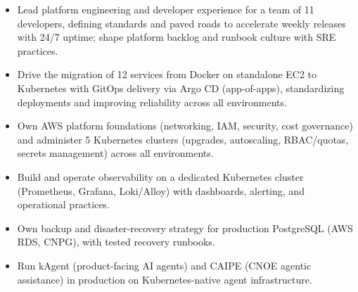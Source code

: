 \documentclass[10pt,a4paper]{altacv}
\begin{document}
\begin{itemize}
  \item Lead platform engineering and developer experience for a team of 11 developers, defining standards and paved roads to accelerate weekly releases with 24/7 uptime; shape platform backlog and runbook culture with SRE practices.
  \item Drive the migration of 12 services from Docker on standalone EC2 to Kubernetes with GitOps delivery via Argo CD (app-of-apps), standardizing deployments and improving reliability across all environments.
  \item Own AWS platform foundations (networking, IAM, security, cost governance) and administer 5 Kubernetes clusters (upgrades, autoscaling, RBAC/quotas, secrets management) across all environments.
  \item Build and operate observability on a dedicated Kubernetes cluster (Prometheus, Grafana, Loki/Alloy) with dashboards, alerting, and operational practices.
  \item Own backup and disaster-recovery strategy for production PostgreSQL (AWS RDS, CNPG), with tested recovery runbooks.
  \item Run kAgent (product-facing AI agents) and CAIPE (CNOE agentic assistance) in production on Kubernetes-native agent infrastructure.
\end{itemize}

\divider
{}
\end{document}
